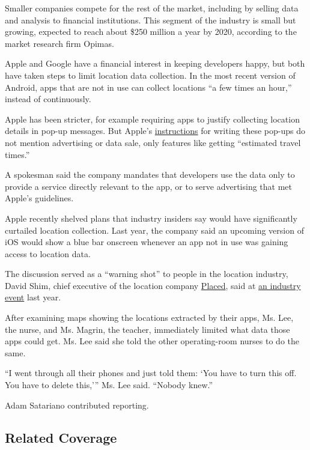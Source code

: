 Smaller companies compete for the rest of the market, including by
selling data and analysis to financial institutions. This segment of the
industry is small but growing, expected to reach about \$250 million a
year by 2020, according to the market research firm Opimas.

Apple and Google have a financial interest in keeping developers happy,
but both have taken steps to limit location data collection. In the most
recent version of Android, apps that are not in use can collect
locations ``a few times an hour,'' instead of continuously.

Apple has been stricter, for example requiring apps to justify
collecting location details in pop-up messages. But Apple's
\href{https://developer.apple.com/design/human-interface-guidelines/ios/app-architecture/requesting-permission/}{instructions}
for writing these pop-ups do not mention advertising or data sale, only
features like getting ``estimated travel times.''

A spokesman said the company mandates that developers use the data only
to provide a service directly relevant to the app, or to serve
advertising that met Apple's guidelines.

Apple recently shelved plans that industry insiders say would have
significantly curtailed location collection. Last year, the company said
an upcoming version of iOS would show a blue bar onscreen whenever an
app not in use was gaining access to location data.

The discussion served as a ``warning shot'' to people in the location
industry, David Shim, chief executive of the location company
\href{https://www.placed.com/}{Placed}, said at
\href{https://www.youtube.com/watch?v=ExDwELoLAJ8}{an industry event}
last year.

After examining maps showing the locations extracted by their apps, Ms.
Lee, the nurse, and Ms. Magrin, the teacher, immediately limited what
data those apps could get. Ms. Lee said she told the other
operating-room nurses to do the same.

``I went through all their phones and just told them: `You have to turn
this off. You have to delete this,''' Ms. Lee said. ``Nobody knew.''

Adam Satariano contributed reporting.

\hypertarget{related-coverage}{%
\subsection{Related Coverage}\label{related-coverage}}

